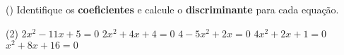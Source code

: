 \begin{question}[type=exam] ()%
 Identifique os \textbf{coeficientes} e calcule o \textbf{discriminante} para cada equação.
\begin{tasks}(2)
        \task $2x^2-11x+5=0$
        \task $2x^2+4x+4=0$
        \task $4-5x^2+2x=0$
        \task $4x^2+2x+1=0$
        \task $x^2+8x+16=0$
    \end{tasks}
\end{question}